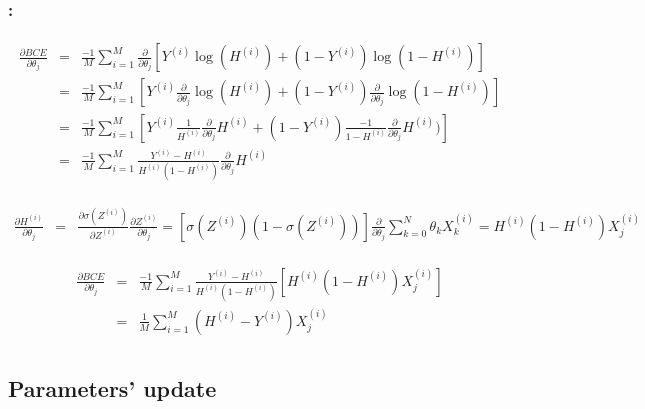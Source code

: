 \documentclass[xcolor=table]{beamer}
\begin{document}
\begin{frame}
	\frametitle{\insertshortsubtitle: \insertsection}
	\framesubtitle{\insertsubsection}

	\tiny\vspace{-6pt}
	\begin{align*}
	\frac{\partial BCE}{\partial \theta_j} 
	& = & \frac{-1}{M} \sum\limits_{i=1}^{M} \frac{\partial}{\partial \theta_j} [Y^{(i)} \log(H^{(i)}) + (1- Y^{(i)}) \log(1 - H^{(i)})] \\
	& = & \frac{-1}{M} \sum\limits_{i=1}^{M} [ Y^{(i)} \frac{\partial}{\partial \theta_j} \log(H^{(i)}) + (1- Y^{(i)}) \frac{\partial}{\partial \theta_j}\log(1 - H^{(i)})]\\
	& = & \frac{-1}{M} \sum\limits_{i=1}^{M} [ Y^{(i)} \frac{1}{H^{(i)}} \frac{\partial}{\partial \theta_j} H^{(i)} + (1- Y^{(i)}) \frac{-1}{1-H^{(i)}} \frac{\partial}{\partial \theta_j} H^{(i)})] \\
	& = & \frac{-1}{M} \sum\limits_{i=1}^{M} \frac{Y^{(i)}-H^{(i)}}{H^{(i)}(1-H^{(i)})} \frac{\partial}{\partial \theta_j} H^{(i)} \\
	\end{align*}
	
	\vspace{-3pt}
	\begin{align*}
	\frac{\partial H^{(i)}}{\partial \theta_j} 
	& = & \frac{\partial \sigma(Z^{(i)})}{\partial Z^{(i)}} \frac{\partial Z^{(i)}}{\partial \theta_j}
	 =  [\sigma(Z^{(i)}) (1-\sigma(Z^{(i)}))]\frac{\partial}{\partial \theta_j} \sum\limits_{k=0}^{N} \theta_k X_k^{(i)} 
	 =  H^{(i)} (1-H^{(i)})  X_j^{(i)}\\
	\end{align*}
	
	\vspace{-3pt}
	\begin{align*}
	\frac{\partial BCE}{\partial \theta_j} 
	& = & \frac{-1}{M} \sum\limits_{i=1}^{M} \frac{Y^{(i)}-H^{(i)}}{H^{(i)}(1-H^{(i)})} [H^{(i)} (1-H^{(i)}) X_j^{(i)}] \\
	& = & \frac{1}{M} \sum\limits_{i=1}^{M} (H^{(i)} - Y^{(i)}) X_j^{(i)}\\
	\end{align*}
		
\end{frame}

\subsection{Parameters' update}
\end{document}
